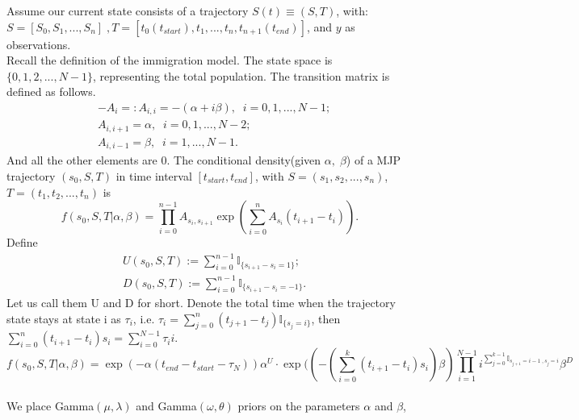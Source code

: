   \noindent Assume our current state consists of a trajectory $S(t) \equiv (S,T)$,
  with: $S = [S_0,S_1, ...,S_n] \;, T = [t_0(t_{start}), t_1,...,t_n, t_{n+1}(t_{end})]$, and $y$ as observations.\\
Recall the definition of the immigration model. The state space is 
$\{0, 1, 2, ..., N - 1 \}$, representing the total population. The transition matrix is defined as follows. 
\begin{align*}
&-A_i =: A_{i,i} = -(\alpha + i\beta), \; \; i =0,1,...,N - 1 ;\\
&A_{i, i+1} = \alpha, \; \; i =0,1,...,N-2;\\
&A_{i, i-1}  = \beta, \; \;  i =1,...,N - 1.
\end{align*} And all the other elements are $0$.
The conditional density(given $\alpha,\; \beta$) of a MJP trajectory $(s_0, S, T)$ in time interval $[t_{start}, t_{end}]$, with $S=(s_1, s_2,..., s_n)$, $T=(t_1, t_2,..., t_n)$ is 
$$f(s_0,S,T| \alpha, \beta) = \prod_{i=0}^{n-1} A_{s_i, s_{i+1}} \exp(\sum_{i=0}^{n} A_{s_i}(t_{i+1} - t_{i})).$$
Define
\begin{align*}
&U(s_0, S, T):= \sum_{i=0}^{n-1} \mathbb{I}_{\{s_{i+1} - s_i = 1\}} ; \\
&D(s_0, S, T):= \sum_{i=0}^{n-1} \mathbb{I}_{\{s_{i+1} - s_i = -1\}}.
\end{align*}
Let us call them U and D for short. Denote the total time when the trajectory state stays at state i as $\tau_i$, i.e. $\tau_i = \sum_{j=0}^{n} (t_{j+1} -t_j)\mathbb{I}_{\{s_j = i\}}$, then $\sum_{i=0}^n (t_{i+1} - t_i)s_i = \sum_{i=0}^{N - 1} \tau_ii.$
$$f(s_0,S,T| \alpha, \beta) = \exp(-\alpha(t_{end} - t_{start}- \tau_N) )\alpha^U \cdot  \exp((-(\sum_{i=0}^k (t_{i+1} - t_i)s_i)\beta) \prod_{i=1}^{N - 1} i^{\sum_{j=0}^{k-1}\mathbb{I}_{s_{j+1} = i -1 \;,  s_j = i} }   \beta^D$$\\
We place Gamma$(\mu, \lambda)$ and Gamma$(\omega,  \theta)$ priors on the parameters $\alpha$ and $\beta$,

